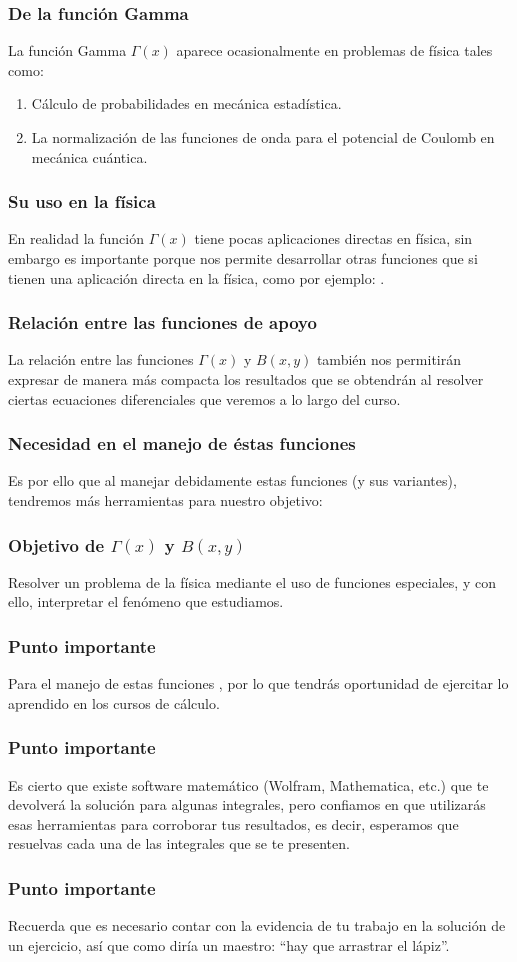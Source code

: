 \documentclass[12pt]{beamer}
\begin{document}
\begin{frame}
\frametitle{De la función Gamma}
La función Gamma $\Gamma (x)$ aparece ocasionalmente en problemas de física tales como:
\pause
{}
\begin{enumerate}[<+->]
\item Cálculo de probabilidades en mecánica estadística.
\item La normalización de las funciones de onda para el potencial de Coulomb en mecánica cuántica.
\end{enumerate}
\end{frame}
\begin{frame}
\frametitle{Su uso en la física}
En realidad la función $\Gamma (x)$ tiene pocas aplicaciones directas en física, \pause sin embargo es importante porque nos permite desarrollar otras funciones que si tienen una aplicación directa en la física, como por ejemplo: .
\end{frame}
\begin{frame}
\frametitle{Relación entre las funciones de apoyo}
La relación entre las funciones $\Gamma (x)$ y $B (x, y)$ también nos permitirán expresar de manera más compacta los resultados que se obtendrán al resolver ciertas ecuaciones diferenciales que veremos a lo largo del curso.
\end{frame}
\begin{frame}
\frametitle{Necesidad en el manejo de éstas funciones}
Es por ello que al manejar debidamente estas funciones (y sus variantes), tendremos más herramientas para nuestro objetivo:
\end{frame}
\begin{frame}
\frametitle{Objetivo de $\Gamma (x)$ y $B (x, y)$}
Resolver un problema de la física mediante el uso de funciones especiales, y con ello, interpretar el fenómeno que estudiamos.
\end{frame}
\begin{frame}
\frametitle{Punto importante}
Para el manejo de estas funciones , por lo que tendrás oportunidad de ejercitar lo aprendido en los cursos de cálculo.
\end{frame}
\begin{frame}
\frametitle{Punto importante}
Es cierto que existe software matemático (Wolfram, Mathematica, etc.) que te devolverá la solución para algunas integrales, pero confiamos en que utilizarás esas herramientas para corroborar tus resultados, es decir, \pause esperamos que resuelvas  cada una de las integrales que se te presenten.
\end{frame}
\begin{frame}
\frametitle{Punto importante}
Recuerda que es necesario contar con la evidencia de tu trabajo en la solución de un ejercicio, así que como diría un maestro: \enquote{hay que arrastrar el lápiz}.
\end{frame}
\end{document}
